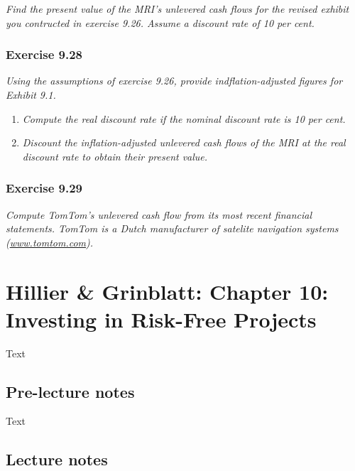 \documentclass[]{book}
\theoremstyle{definition}
\theoremstyle{definition}
\theoremstyle{remark}
\begin{document}
\emph{Find the present value of the MRI's unlevered cash flows for the
revised exhibit you contructed in exercise 9.26. Assume a discount rate
of 10 per cent.} \citep[p.309]{book}

\subsection{Exercise 9.28}\label{exercise-9.28}

\emph{Using the assumptions of exercise 9.26, provide
indflation-adjusted figures for Exhibit 9.1.} \citep[p.309]{book}

\begin{enumerate}
\def\labelenumi{\alph{enumi}.}
\item
  \emph{Compute the real discount rate if the nominal discount rate is
  10 per cent.} \citep[p.309]{book}
\item
  \emph{Discount the inflation-adjusted unlevered cash flows of the MRI
  at the real discount rate to obtain their present value.}
  \citep[p.309]{book}
\end{enumerate}

\subsection{Exercise 9.29}\label{exercise-9.29}

\emph{Compute TomTom's unlevered cash flow from its most recent
financial statements. TomTom is a Dutch manufacturer of satelite
navigation systems (\href{http://www.tomtom.com}{www.tomtom.com}).}
\citep[p.309]{book}

\chapter{Hillier \& Grinblatt: Chapter 10: Investing in Risk-Free
Projects}\label{hillier-grinblatt-chapter-10-investing-in-risk-free-projects}

Text

\section{Pre-lecture notes}\label{pre-lecture-notes-9}

Text

\section{Lecture notes}\label{lecture-notes-9}
\end{document}

